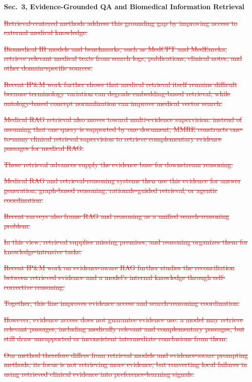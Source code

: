 \documentclass[12pt]{article}
\newcommand{\deleted}[1]{\textcolor{red}{\sout{#1}}}
\begin{document}
\noindent\textbf{Sec.~3, Evidence-Grounded QA and Biomedical Information Retrieval}
\begin{displayquote}
\deleted{Retrieval-centered methods address this grounding gap by improving access to external medical knowledge.}

\deleted{Biomedical IR models and benchmarks, such as MedCPT and MedEureka, retrieve relevant medical texts from search logs, publications, clinical notes, and other domain-specific sources.}

\deleted{Recent IP\&M work further shows that medical retrieval itself remains difficult because terminology variation can degrade embedding-based retrieval, while ontology-based concept normalization can improve medical vector search.}

\deleted{Medical RAG retrieval also moves toward multi-evidence supervision: instead of assuming that one query is supported by one document, MMRE constructs one-to-many clinical retrieval supervision to retrieve complementary evidence passages for medical RAG.}

\deleted{These retrieval advances supply the evidence base for downstream reasoning.}

\deleted{Medical RAG and retrieval-reasoning systems then use this evidence for answer generation, graph-based reasoning, rationale-guided retrieval, or agentic coordination.}

\deleted{Recent surveys also frame RAG and reasoning as a unified search-reasoning problem.}

\deleted{In this view, retrieval supplies missing premises, and reasoning organizes them for knowledge-intensive tasks.}

\deleted{Recent IP\&M work on evidence-aware RAG further studies the reconciliation between retrieved evidence and a model's internal knowledge through self-corrective reasoning.}

\deleted{Together, this line improves evidence access and search-reasoning coordination.}

\deleted{However, evidence access does not guarantee evidence use: a model may retrieve relevant passages, including medically relevant and complementary passages, but still draw unsupported or inconsistent intermediate conclusions from them.}

\deleted{Our method therefore differs from retrieval models and evidence-aware prompting methods; its focus is not retrieving more evidence, but converting local failures in using retrieved clinical evidence into preference-learning signals.}


\end{displayquote}
\end{document}

